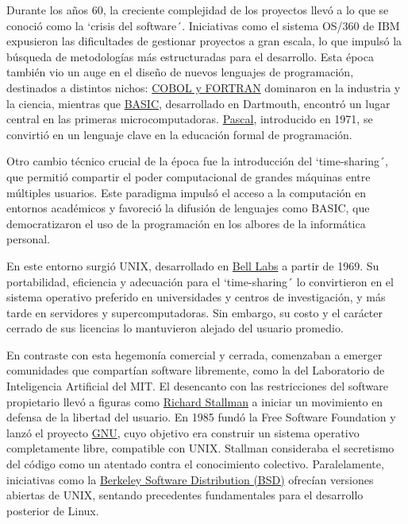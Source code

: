 \documentclass[a4paper,12pt]{article}
\begin{document}
Durante los años 60, la creciente complejidad de los proyectos llevó a lo que se
conoció como la `crisis del software´. Iniciativas como el sistema OS/360 de IBM
expusieron las dificultades de gestionar proyectos a gran escala, lo que impulsó
la búsqueda de metodologías más estructuradas para el desarrollo. Esta época
también vio un auge en el diseño de nuevos lenguajes de programación, destinados
a distintos nichos: \hyperlink{cobolfortran}{COBOL y FORTRAN} dominaron en la
industria y la ciencia, mientras que \hyperlink{basic}{BASIC}, desarrollado en
Dartmouth, encontró un lugar central en las primeras microcomputadoras.
\hyperlink{pascal}{Pascal}, introducido en 1971, se convirtió en un lenguaje
clave en la educación formal de programación.

Otro cambio técnico crucial de la época fue la introducción del \textquoteleft time-sharing´,
que permitió compartir el poder computacional de grandes máquinas entre
múltiples usuarios. Este paradigma impulsó el acceso a la computación en
entornos académicos y favoreció la difusión de lenguajes como BASIC, que
democratizaron el uso de la programación en los albores de la informática
personal.

En este entorno surgió UNIX, desarrollado en \hyperlink{belllabs}{Bell Labs} a partir de 1969. Su
portabilidad, eficiencia y adecuación para el `time-sharing´ lo convirtieron en el
sistema operativo preferido en universidades y centros de investigación, y más
tarde en servidores y supercomputadoras. Sin embargo, su costo y el carácter
cerrado de sus licencias lo mantuvieron alejado del usuario promedio.

En contraste con esta hegemonía comercial y cerrada, comenzaban a emerger
comunidades que compartían software libremente, como la del Laboratorio de
Inteligencia Artificial del MIT. El desencanto con las restricciones del
software propietario llevó a figuras como \hyperlink{richardstallman}{Richard Stallman} a iniciar un
movimiento en defensa de la libertad del usuario. En 1985 fundó la Free Software
Foundation y lanzó el proyecto \hyperlink{gnu}{GNU}, cuyo objetivo era construir un sistema
operativo completamente libre, compatible con UNIX. Stallman consideraba el
secretismo del código como un atentado contra el conocimiento colectivo.
Paralelamente, iniciativas como la \hyperlink{bsd}{Berkeley Software Distribution (BSD)} ofrecían
versiones abiertas de UNIX, sentando precedentes fundamentales para el
desarrollo posterior de Linux.
\end{document}
